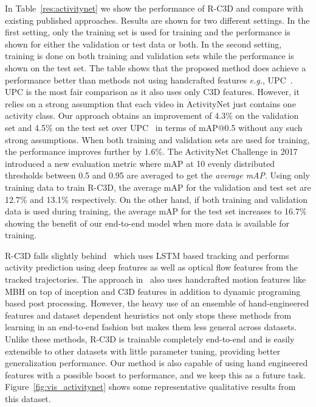 \documentclass[10pt,twocolumn,letterpaper]{article}
\newcommand{\modelname}[0]{R-C3D }
\begin{document}
In Table~\ref{res:activitynet} we show the performance of \modelname and compare with existing published approaches.
Results are shown for two different settings.
In the first setting, only the training set is used for training and the performance is shown for either the validation or test data or both.
In the second setting, training is done on both training and validation sets while the performance is shown on the test set.
The table shows that the proposed method does achieve a performance better than methods not using handcrafted features \textit{e.g.}, UPC~\cite{montes2016temporal}.
UPC is the most fair comparison as it also uses only C3D features.
However, it relies on a strong assumption that each video in ActivityNet just contains one activity class.
Our approach obtains an improvement of 4.3\% on the validation set and 4.5\% on the test set over UPC~\cite{montes2016temporal} in terms of mAP@0.5 without any such strong assumptions.
When both training and validation sets are used for training, the performance improves further by 1.6\%. 
The ActivityNet Challenge in 2017 introduced a new evaluation metric where mAP at 10 evenly distributed thresholds between 0.5 and 0.95 are averaged to get the \emph{average mAP}.
Using only training data to train R-C3D, the average mAP for the validation and test set are 12.7\% and 13.1\% respectively.
On the other hand, if both training and validation data is used during training, the average mAP for the test set increases to 16.7\% showing the benefit of our end-to-end model when more data is available for training.

\modelname falls slightly behind~\cite{Singh2016a} which uses LSTM based tracking and performs activity prediction using deep features as well as optical flow features from the tracked trajectories.
The approach in~\cite{Singh2016b} also uses handcrafted motion features like MBH on top of inception and C3D features in addition to dynamic programing based post processing.
However, the heavy use of an ensemble of hand-engineered features and dataset dependent heuristics not only stops these methods from learning in an end-to-end fashion but makes them less general across datasets.
Unlike these methods, \modelname is trainable completely end-to-end and is easily extensible to other datasets with little parameter tuning, providing better generalization performance.
Our method is also capable of using hand engineered features with a possible boost to performance, and we keep this as a future task.
Figure~\ref{fig:vis_activitynet} shows some representative qualitative results from this dataset.
\end{document}
